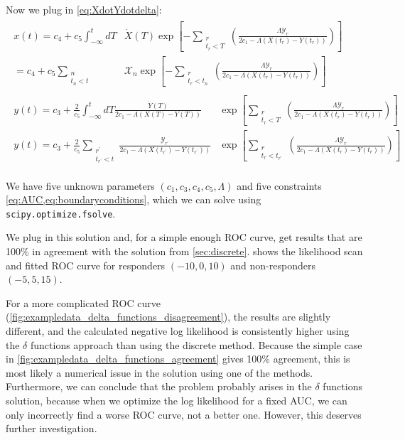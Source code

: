 \documentclass[11pt]{article}
\newcommand{\Xdot}{\dot{X}}
\newcommand{\Ydot}{\dot{Y}}
\newcommand{\AUC}{AUC}
\begin{document}
Now we plug in \cref{eq:XdotYdotdelta}:
\begin{align}
\begin{aligned}
x(t)=c_4+c_5\int_{-\infty}^{t} dT &\Xdot(T)\exp\left[-\sum_{\substack{r\\t_r<T}} \left(\frac{\Lambda\mathscr{Y}_r}{2c_1-\Lambda (X(t_r)-Y(t_r))}\right) \right] \\
    =c_4+c_5\sum_{\substack{n\\t_n<t}} &\mathscr{X}_n\exp\left[-\sum_{\substack{r\\t_r<t_n}} \left(\frac{\Lambda\mathscr{Y}_r}{2c_1-\Lambda (X(t_r)-Y(t_r))}\right) \right]
\end{aligned} \\
\begin{aligned}
y(t)=c_3+\frac{2}{c_5}\int_{-\infty}^{t} dT \frac{\Ydot(T)}{2c_1-\Lambda(X(T)-Y(T))} &\exp\left[\sum_{\substack{r\\t_r<T}} \left(\frac{\Lambda\mathscr{Y}_r}{2c_1-\Lambda (X(t_r)-Y(t_r))}\right) \right] \\
y(t)=c_3+\frac{2}{c_5}\sum_{\substack{r^\prime\\t_{r^\prime}<t}} \frac{\mathscr{Y}_{r^\prime}}{2c_1-\Lambda(X(t_{r^\prime})-Y(t_{r^\prime}))} &\exp\left[\sum_{\substack{r\\t_r<t_{r^\prime}}} \left(\frac{\Lambda\mathscr{Y}_r}{2c_1-\Lambda (X(t_r)-Y(t_r))}\right) \right]
\end{aligned}
\end{align}

We have five unknown parameters \((c_1, c_3, c_4, c_5, \Lambda)\) and five constraints \cref{eq:AUC,eq:boundaryconditions}, which we can solve using \texttt{scipy.optimize.fsolve}.

We plug in this solution and, for a simple enough ROC curve, get results that are 100\% in agreement with the solution from \cref{sec:discrete}.   shows the likelihood scan and fitted ROC curve for responders \((-10, 0, 10)\) and non-responders \((-5, 5, 15)\).

For a more complicated ROC curve (\cref{fig:exampledata_delta_functions_disagreement}), the results are slightly different, and the calculated negative log likelihood is consistently higher using the \(\delta\) functions approach than using the discrete method.  Because the simple case in \cref{fig:exampledata_delta_functions_agreement} gives 100\% agreement, this is most likely a numerical issue in the solution using one of the methods.  Furthermore, we can conclude that the problem probably arises in the \(\delta\) functions solution, because when we optimize the log likelihood for a fixed \AUC, we can only incorrectly find a worse ROC curve, not a better one.  However, this deserves further investigation.
\end{document}
